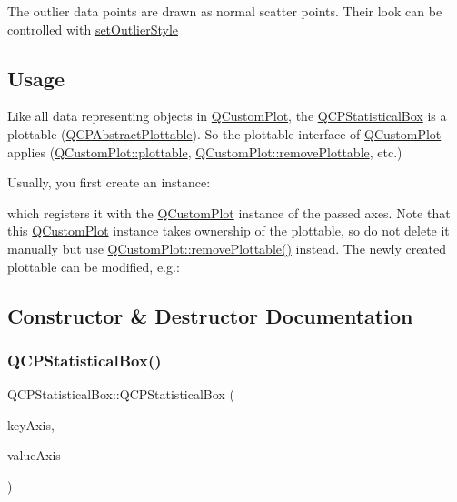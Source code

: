 The outlier data points are drawn as normal scatter points. Their look can be controlled with \hyperlink{class_q_c_p_statistical_box_ad5241943422eb8e58360a97e99ad6aa7}{set\+Outlier\+Style}\hypertarget{class_q_c_p_statistical_box_qcpstatisticalbox-usage}{}\subsection{Usage}\label{class_q_c_p_statistical_box_qcpstatisticalbox-usage}
Like all data representing objects in \hyperlink{class_q_custom_plot}{Q\+Custom\+Plot}, the \hyperlink{class_q_c_p_statistical_box}{Q\+C\+P\+Statistical\+Box} is a plottable (\hyperlink{class_q_c_p_abstract_plottable}{Q\+C\+P\+Abstract\+Plottable}). So the plottable-\/interface of \hyperlink{class_q_custom_plot}{Q\+Custom\+Plot} applies (\hyperlink{class_q_custom_plot_a32de81ff53e263e785b83b52ecd99d6f}{Q\+Custom\+Plot\+::plottable}, \hyperlink{class_q_custom_plot_af3dafd56884208474f311d6226513ab2}{Q\+Custom\+Plot\+::remove\+Plottable}, etc.)

Usually, you first create an instance\+: 
\begin{DoxyCodeInclude}
\end{DoxyCodeInclude}
which registers it with the \hyperlink{class_q_custom_plot}{Q\+Custom\+Plot} instance of the passed axes. Note that this \hyperlink{class_q_custom_plot}{Q\+Custom\+Plot} instance takes ownership of the plottable, so do not delete it manually but use \hyperlink{class_q_custom_plot_af3dafd56884208474f311d6226513ab2}{Q\+Custom\+Plot\+::remove\+Plottable()} instead. The newly created plottable can be modified, e.\+g.\+: 
\begin{DoxyCodeInclude}
\end{DoxyCodeInclude}


\subsection{Constructor \& Destructor Documentation}
\mbox{\label{class_q_c_p_statistical_box_a75c2b3e7fcd0741cc981693a2ba63b27}} 
\subsubsection{\texorpdfstring{Q\+C\+P\+Statistical\+Box()}{QCPStatisticalBox()}}
{\footnotesize\ttfamily Q\+C\+P\+Statistical\+Box\+::\+Q\+C\+P\+Statistical\+Box (\begin{DoxyParamCaption}\item[{\hyperlink{class_q_c_p_axis}{Q\+C\+P\+Axis} $\ast$}]{key\+Axis,  }\item[{\hyperlink{class_q_c_p_axis}{Q\+C\+P\+Axis} $\ast$}]{value\+Axis }\end{DoxyParamCaption})\hspace{0.3cm}{\ttfamily [explicit]}}

